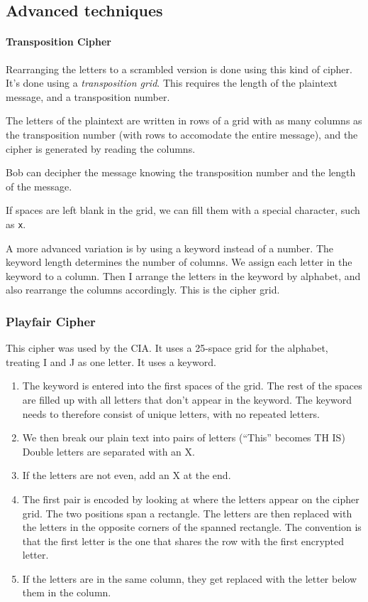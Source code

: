 \subsection{Advanced techniques}

\paragraph{Transposition Cipher} Rearranging the letters to a scrambled version is done using this kind of cipher. It's done using a \textit{transposition grid}. This requires the length of the plaintext message, and a transposition number.

The letters of the plaintext are written in rows of a grid with as many columns as the transposition number (with rows to accomodate the entire message), and the cipher is generated by reading the columns.

Bob can decipher the message knowing the transposition number and the length of the message.

If spaces are left blank in the grid, we can fill them with a special character, such as \texttt{x}.

A more advanced variation is by using a keyword instead of a number. The keyword length determines the number of columns. We assign each letter in the keyword to a column. Then I arrange the letters in the keyword by alphabet, and also rearrange the columns accordingly. This is the cipher grid.

\subsubsection{Playfair Cipher} This cipher was used by the CIA. It uses a 25-space grid for the alphabet, treating I and J as one letter. It uses a keyword.

\begin{enumerate}
    \item The keyword is entered into the first spaces of the grid. The rest of the spaces are filled up with all letters that don't appear in the keyword. The keyword needs to therefore consist of unique letters, with no repeated letters.
    \item We then break our plain text into pairs of letters (``This'' becomes TH IS) Double letters are separated with an X.
    \item If the letters are not even, add an X at the end.
    \item The first pair is encoded by looking at where the letters appear on the cipher grid. The two positions span a rectangle. The letters are then replaced with the letters in the opposite corners of the spanned rectangle. The convention is that the first letter is the one that shares the row with the first encrypted letter.
    \item If the letters are in the same column, they get replaced with the letter below them in the column.
\end{enumerate}

